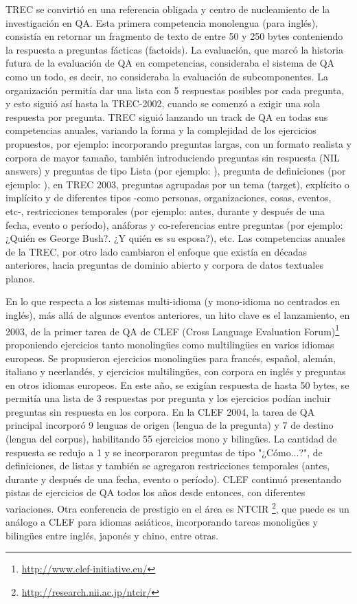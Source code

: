TREC se convirtió en una referencia obligada y centro de nucleamiento de la investigación en QA. Esta primera competencia monolengua (para inglés), consistía en retornar un fragmento de texto de entre 50 y 250 bytes conteniendo la respuesta a preguntas fácticas (factoids). La evaluación, que marcó la historia futura de la evaluación de QA en competencias, consideraba el sistema de QA como un todo, es decir, no consideraba la evaluación de subcomponentes. La organización permitía dar una lista con 5 respuestas posibles por cada pregunta, y esto siguió así hasta la TREC-2002, cuando se comenzó a exigir una sola respuesta por pregunta. TREC siguió lanzando un track de QA en todas sus competencias anuales, variando la forma y la complejidad de los ejercicios propuestos, por ejemplo: incorporando preguntas largas, con un formato realista y corpora de mayor tamaño, también introduciendo preguntas sin respuesta (NIL answers) y preguntas de tipo Lista (por ejemplo: ), pregunta de definiciones (por ejemplo: ), en TREC 2003, preguntas agrupadas por un tema (target), explícito o implícito y de diferentes tipos -como personas, organizaciones, cosas, eventos, etc-, restricciones temporales (por ejemplo: antes, durante y después de una fecha, evento o período), anáforas y co-referencias entre preguntas (por ejemplo: ¿Quién es George Bush?. ¿Y quién es \textit{su} esposa?), etc. Las competencias anuales de la TREC, por otro lado cambiaron el enfoque que existía en décadas anteriores, hacia preguntas de dominio abierto y corpora de datos textuales planos. 

En lo que respecta a los sistemas multi-idioma (y mono-idioma no centrados en inglés), más allá de algunos eventos anteriores, un hito clave es el lanzamiento, en 2003, de la primer tarea de QA \cite{CLEF03} de CLEF (Cross Language Evaluation Forum)\footnote{\url{http://www.clef-initiative.eu/}} proponiendo ejercicios tanto monolingües como multilingües en varios idiomas europeos. Se propusieron ejercicios monolingües para francés, español, alemán, italiano y neerlandés, y ejercicios multilingües, con corpora en inglés y preguntas en otros idiomas europeos. En este año, se exigían respuesta de hasta 50 bytes, se permitía una lista de 3 respuestas por pregunta y los ejercicios podían incluir preguntas sin respuesta en los corpora. En la CLEF 2004, la tarea de QA principal incorporó 9 lenguas de origen (lengua de la pregunta) y 7 de destino (lengua del corpus), habilitando 55 ejercicios mono y bilingües. La cantidad de respuesta se redujo a 1 y se incorporaron preguntas de tipo "¿Cómo...?", de definiciones, de listas y también se agregaron restricciones temporales (antes, durante y después de una fecha, evento o período). CLEF continuó presentando pistas de ejercicios de QA todos los años desde entonces, con diferentes variaciones. Otra conferencia de prestigio en el área es NTCIR \footnote{\url{http://research.nii.ac.jp/ntcir/}}, que puede es un análogo a CLEF para idiomas asiáticos, incorporando tareas monoligües y bilingües entre inglés, japonés y chino, entre otras.

